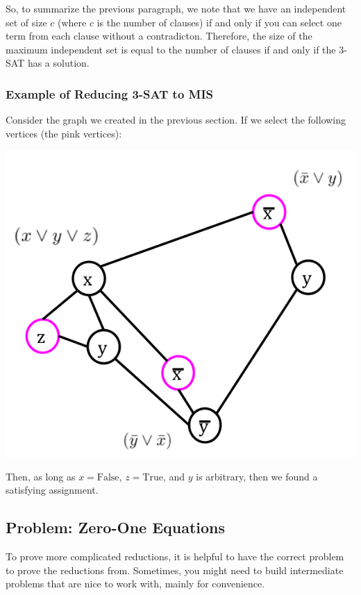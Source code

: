 \documentclass[letterpaper]{article}
\begin{document}
\bigskip 

So, to summarize the previous paragraph, we note that we have an independent set of size $c$ (where $c$ is the number of clauses) if and only if you can select one term from each clause without a contradicton. Therefore, the size of the maximum independent set is equal to the number of clauses if and only if the 3-SAT has a solution. 

\subsubsection{Example of Reducing 3-SAT to MIS}
Consider the graph we created in the previous section. If we select the following vertices (the pink vertices): 
\begin{center}
    \includegraphics[scale=0.4]{assets/3sat_mis_4.png}
\end{center}
Then, as long as $x = \text{False}$, $z = \text{True}$, and $y$ is arbitrary, then we found a satisfying assignment. 

\subsection{Problem: Zero-One Equations}
To prove more complicated reductions, it is helpful to have the correct problem to prove the reductions from. Sometimes, you might need to build intermediate problems that are nice to work with, mainly for convenience. 
\end{document}
